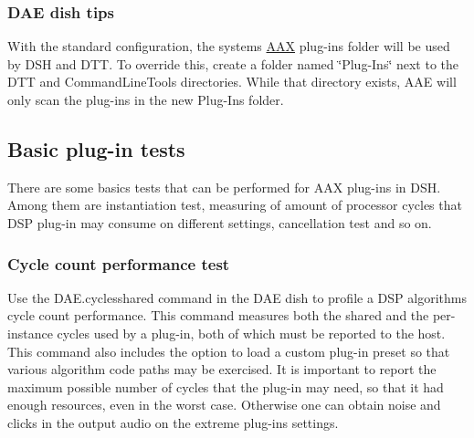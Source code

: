 \hypertarget{a00835_subsection__dsh_tips}{}\subsubsection{D\+A\+E dish tips}\label{a00835_subsection__dsh_tips}
 
\begin{DoxyItemize}
\item With the standard configuration, the system\textquotesingle{}s \mbox{\hyperlink{a00852}{A\+AX}} plug-\/ins folder will be used by D\+SH and D\+TT. To override this, create a folder named \char`\"{}\+Plug-\/\+Ins\char`\"{} next to the D\+TT and Command\+Line\+Tools directories. While that directory exists, A\+AE will only scan the plug-\/ins in the new Plug-\/\+Ins folder.  
\end{DoxyItemize}



 \hypertarget{a00835_dsh_guide_02_basic_plugin_tests}{}\subsection{Basic plug-\/in tests}\label{a00835_dsh_guide_02_basic_plugin_tests}
 There are some basics tests that can be performed for A\+AX plug-\/ins in D\+SH. Among them are instantiation test, measuring of amount of processor cycles that D\+SP plug-\/in may consume on different settings, cancellation test and so on.

\hypertarget{a00835_subsection__cyclessharedtest}{}\subsubsection{Cycle count performance test}\label{a00835_subsection__cyclessharedtest}
 Use the D\+A\+E.\+cyclesshared command in the D\+AE dish to profile a D\+SP algorithm\textquotesingle{}s cycle count performance. This command measures both the shared and the per-\/instance cycles used by a plug-\/in, both of which must be reported to the host. This command also includes the option to load a custom plug-\/in preset so that various algorithm code paths may be exercised. It is important to report the maximum possible number of cycles that the plug-\/in may need, so that it had enough resources, even in the worst case. Otherwise one can obtain noise and clicks in the output audio on the extreme plug-\/in\textquotesingle{}s settings.

